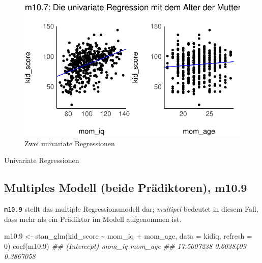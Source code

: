 \documentclass[
  a4paper,
  DIV=11]{scrreprt}
\newenvironment{Shaded}{\begin{snugshade}}{\end{snugshade}}
\newcommand{\AttributeTok}[1]{\textcolor[rgb]{0.40,0.45,0.13}{#1}}
\newcommand{\DecValTok}[1]{\textcolor[rgb]{0.68,0.00,0.00}{#1}}
\newcommand{\DocumentationTok}[1]{\textcolor[rgb]{0.37,0.37,0.37}{\textit{#1}}}
\newcommand{\FloatTok}[1]{\textcolor[rgb]{0.68,0.00,0.00}{#1}}
\newcommand{\FunctionTok}[1]{\textcolor[rgb]{0.28,0.35,0.67}{#1}}
\newcommand{\NormalTok}[1]{\textcolor[rgb]{0.00,0.23,0.31}{#1}}
\newcommand{\OtherTok}[1]{\textcolor[rgb]{0.00,0.23,0.31}{#1}}
\newcommand{\SpecialCharTok}[1]{\textcolor[rgb]{0.37,0.37,0.37}{#1}}
\theoremstyle{definition}
\theoremstyle{remark}
\begin{document}
\begin{figure}[H]

{\centering \includegraphics{./metrische-AV_files/figure-pdf/fig-regr-one-pred-1.pdf}

}

\caption{\label{fig-regr-one-pred}Zwei univariate Regressionen}

\end{figure}

Univariate Regressionen

\hypertarget{multiples-modell-beide-pruxe4diktoren-m10.9}{%
\subsection{Multiples Modell (beide Prädiktoren),
m10.9}\label{multiples-modell-beide-pruxe4diktoren-m10.9}}

\texttt{m10.9} stellt das multiple Regressionsmodell dar;
\emph{multipel} bedeutet in diesem Fall, dass mehr als ein Prädiktor im
Modell aufgenommen ist.

\begin{Shaded}
\begin{Highlighting}[]
\NormalTok{m10}\FloatTok{.9} \OtherTok{\textless{}{-}} \FunctionTok{stan\_glm}\NormalTok{(kid\_score }\SpecialCharTok{\textasciitilde{}}\NormalTok{ mom\_iq }\SpecialCharTok{+}\NormalTok{ mom\_age, }
                  \AttributeTok{data =}\NormalTok{ kidiq, }
                  \AttributeTok{refresh =} \DecValTok{0}\NormalTok{)}
\FunctionTok{coef}\NormalTok{(m10}\FloatTok{.9}\NormalTok{)}
\DocumentationTok{\#\# (Intercept)      mom\_iq     mom\_age }
\DocumentationTok{\#\#  17.5607238   0.6038409   0.3867058}
\end{Highlighting}
\end{Shaded}
\end{document}
